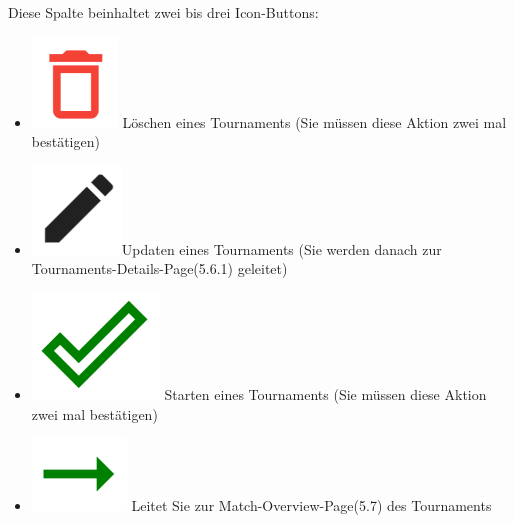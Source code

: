 Diese Spalte beinhaltet zwei bis drei Icon-Buttons:
\begin{itemize}
    \item \includegraphics[scale=0.3]{pics/user-guide/delete-icon.PNG} Löschen eines Tournaments (Sie müssen diese Aktion zwei mal bestätigen)
    \item \includegraphics[scale=0.3]{pics/user-guide/edit-icon.PNG}Updaten eines Tournaments (Sie werden danach zur Tournaments-Details-Page(5.6.1) geleitet)
    \item \includegraphics[scale=0.3]{pics/user-guide/submit-icon.PNG} Starten eines Tournaments (Sie müssen diese Aktion zwei mal bestätigen)
    \item \includegraphics[scale=0.3]{pics/user-guide/go-to-icon.PNG} Leitet Sie zur Match-Overview-Page(5.7) des Tournaments
\end{itemize}

